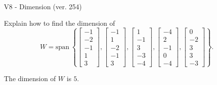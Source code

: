 \begin{exercise}
  \begin{exerciseTitle}V8 - Dimension (ver. 254)\end{exerciseTitle}
  \begin{exerciseStatement}
    Explain how to find the dimension of 
\[W=\mathrm{span}\ \left\{\left[\begin{array}{r}
-1 \\
-2 \\
-1 \\
1 \\
3
\end{array}\right] , \left[\begin{array}{r}
-1 \\
1 \\
-2 \\
-1 \\
3
\end{array}\right] , \left[\begin{array}{r}
1 \\
-1 \\
3 \\
-3 \\
-4
\end{array}\right] , \left[\begin{array}{r}
-4 \\
2 \\
-1 \\
0 \\
-4
\end{array}\right] , \left[\begin{array}{r}
0 \\
-2 \\
3 \\
3 \\
-3
\end{array}\right]\right\}.\]



  \end{exerciseStatement}
  \begin{exerciseAnswer}
   The dimension of \(W\) is  \(5\).
  


  \end{exerciseAnswer}
\end{exercise}